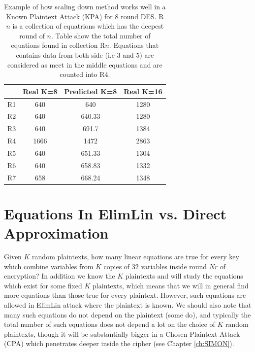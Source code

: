 \begin{table}[h!]
	\caption[Scaling down method results for 8 Rounds DES]{Example of how scaling down method works well in a Known Plaintext Attack (KPA) for 8 round DES. R$n$ is a collection of equatrions which has the deepest round of $n$. Table show the total number of equations found in collection R$n$. Equations that contains data from both side (i.e 3 and 5) are considered as meet in the middle equations and are counted into R4.} \label{tab:scallingdownDES} \centering
	\begin{tabular}{|c|c|c|c|}
		\hline
		& Real K=8 & Predicted K=8 & Real K=16 \\ \hline
		R1  & 640     & 640        & 1280     \\ \hline
		R2  & 640     & 640.33     & 1280     \\ \hline
		R3  & 640     & 691.7     & 1384     \\ \hline
		R4  & 1666   & 1472              & 2863    \\ \hline
		R5  & 640     & 651.33     & 1304     \\ \hline
		R6  & 640     & 658.83          & 1332     \\ \hline
		R7  & 658     & 668.24     & 1348     \\ \hline
	\end{tabular}
\end{table}

\section{Equations In ElimLin vs. Direct Approximation} \label{Sec:ElimLinVsApprox}
\vskip-5pt

Given $K$ random plaintexts,
how many linear equations are true for every key 
which combine variables from $K$ copies of 32 variables
inside round $Nr$ of encryption?
In addition we know the $K$ plaintexts and will study the equations which exist for some fixed $K$ plaintexts, which means that we will in general find more equations than those true for every plaintext. However, such equations are allowed in ElimLin attack where the plaintext is known.
We should also note that many such equations do not depend on the plaintext (some do),
and typically the total number of such equations does not depend a lot on
the choice of $K$ random plaintexts,
though it will be substantially bigger
in a Chosen Plaintext Attack (CPA) which penetrates deeper inside the cipher (see Chapter \ref{ch:SIMON}). 

